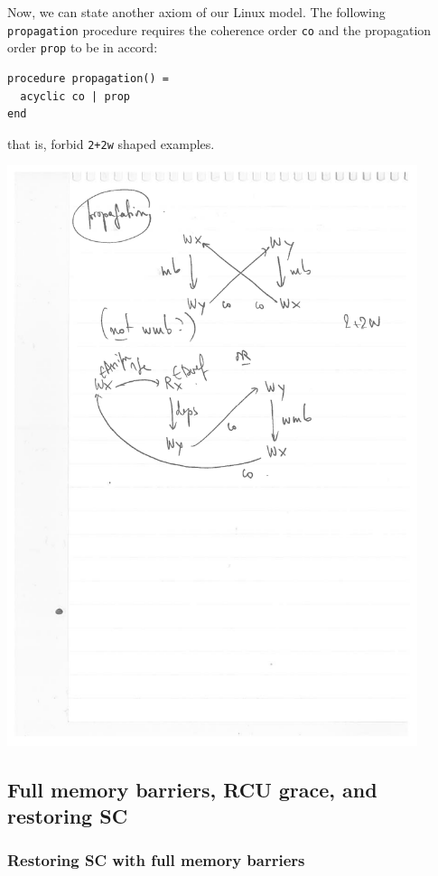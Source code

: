 \documentclass[a4paper]{article}
\begin{document}
\pagebreak

Now, we can state another axiom of our Linux model. The following {\tt
propagation} procedure requires the coherence order {\tt co} and the
propagation order {\tt prop} to be in accord:
\begin{verbatim}
procedure propagation() =
  acyclic co | prop
end
\end{verbatim}
\noindent that is, forbid {\tt 2+2w} shaped examples.

\includegraphics[width=12cm]{propagation}

\subsection{Full memory barriers, RCU grace, and restoring SC}

\subsubsection{Restoring SC with full memory barriers}
\end{document}
